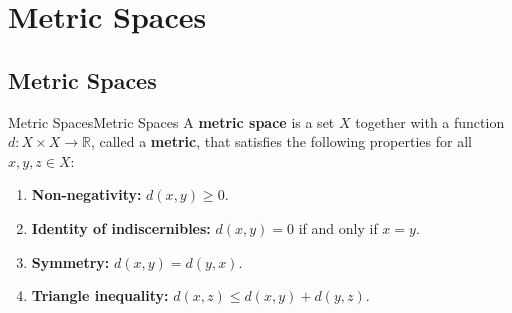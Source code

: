 \documentclass[../main.tex]{subfiles}
\begin{document}
\chapter{Metric Spaces}

\section{Metric Spaces}
\begin{definition}{Metric Spaces}{Metric Spaces}
	A \textbf{metric space} is a set $X$ together with a function $d: X \times X \to \mathbb{R}$, called a \textbf{metric}, that satisfies the following properties for all $x, y, z \in X$:
	\begin{enumerate}
		\item \textbf{Non-negativity:} $d(x, y) \geq 0$.
		\item \textbf{Identity of indiscernibles:} $d(x, y) = 0$ if and only if $x = y$.
		\item \textbf{Symmetry:} $d(x, y) = d(y, x)$.
		\item \textbf{Triangle inequality:} $d(x, z) \leq d(x, y) + d(y, z)$.
	\end{enumerate}
\end{definition}
\end{document}
